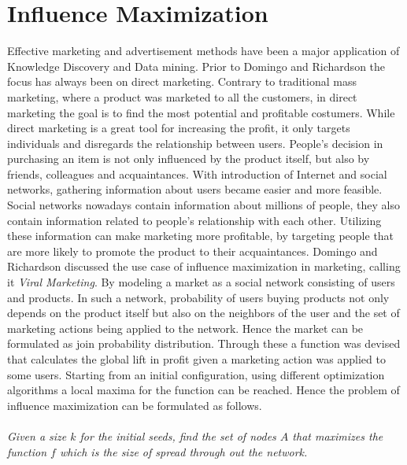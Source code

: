 \documentclass[english]{tktltiki}
\begin{document}
\section{Influence Maximization}
\label{sec:influencemax}
Effective marketing and advertisement methods have been a major application of Knowledge Discovery and Data mining. Prior to Domingo and Richardson \cite{domingo01} the focus has always been on direct marketing. Contrary to traditional mass marketing, where a product was marketed to all the customers, in direct marketing the goal is to find the most potential and profitable costumers. While direct marketing is a great tool for increasing the profit, it only targets individuals and disregards the relationship between users. People's decision in purchasing an item is not only influenced by the product itself, but also by friends, colleagues and acquaintances. With introduction of Internet and social networks, gathering information about users became easier and more feasible. Social networks nowadays contain information about millions of people, they also contain information related to people's relationship with each other. Utilizing these information can make marketing more profitable, by targeting people that are more likely to promote the product to their acquaintances. 
Domingo and Richardson \cite{domingo01} discussed the use case of influence maximization in marketing, calling it \textit{Viral Marketing}. By modeling a market as a social network consisting of users and products. In such a network, probability of users buying products not only depends on the product itself but also on the neighbors of the user and the set of marketing actions being applied to the network. Hence the market can be formulated as join probability distribution. 
Through these a function was devised that calculates the global lift in profit given a marketing action was applied to some users. Starting from an initial configuration, using different optimization algorithms a local maxima for the function can be reached. Hence the problem of influence maximization can be formulated as follows. \\ \\
\textit{Given a size $k$ for the initial seeds, find the set of nodes $A$ that maximizes the function $f$ which is the size of spread through out the network. }\\ \\
\end{document}
